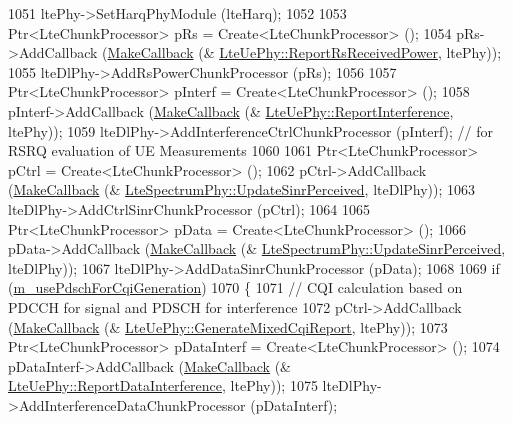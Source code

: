\begin{DoxyCode}
1051         ltePhy->SetHarqPhyModule (lteHarq);
1052 
1053         Ptr<LteChunkProcessor> pRs = Create<LteChunkProcessor> ();
1054         pRs->AddCallback (\hyperlink{group__makecallbackmemptr_ga9376283685aa99d204048d6a4b7610a4}{MakeCallback} (&
      \hyperlink{classns3_1_1LteUePhy_aca025f112e83d159f7a1b0fb822d77b6}{LteUePhy::ReportRsReceivedPower}, ltePhy));
1055         lteDlPhy->AddRsPowerChunkProcessor (pRs);
1056 
1057         Ptr<LteChunkProcessor> pInterf = Create<LteChunkProcessor> ();
1058         pInterf->AddCallback (\hyperlink{group__makecallbackmemptr_ga9376283685aa99d204048d6a4b7610a4}{MakeCallback} (&
      \hyperlink{classns3_1_1LteUePhy_aac25482ac025b043e7d0516927984720}{LteUePhy::ReportInterference}, ltePhy));
1059         lteDlPhy->AddInterferenceCtrlChunkProcessor (pInterf); \textcolor{comment}{// for RSRQ evaluation of UE Measurements}
1060 
1061         Ptr<LteChunkProcessor> pCtrl = Create<LteChunkProcessor> ();
1062         pCtrl->AddCallback (\hyperlink{group__makecallbackmemptr_ga9376283685aa99d204048d6a4b7610a4}{MakeCallback} (&
      \hyperlink{classns3_1_1LteSpectrumPhy_a81e55daa6bf70765f7e7ff7cca0faed9}{LteSpectrumPhy::UpdateSinrPerceived}, lteDlPhy));
1063         lteDlPhy->AddCtrlSinrChunkProcessor (pCtrl);
1064 
1065         Ptr<LteChunkProcessor> pData = Create<LteChunkProcessor> ();
1066         pData->AddCallback (\hyperlink{group__makecallbackmemptr_ga9376283685aa99d204048d6a4b7610a4}{MakeCallback} (&
      \hyperlink{classns3_1_1LteSpectrumPhy_a81e55daa6bf70765f7e7ff7cca0faed9}{LteSpectrumPhy::UpdateSinrPerceived}, lteDlPhy));
1067         lteDlPhy->AddDataSinrChunkProcessor (pData);
1068 
1069         \textcolor{keywordflow}{if} (\hyperlink{classns3_1_1MmWaveHelper_aa22c5cc230f1e0e6bfd280ed2b6f9635}{m\_usePdschForCqiGeneration})
1070         \{
1071                 \textcolor{comment}{// CQI calculation based on PDCCH for signal and PDSCH for interference}
1072                 pCtrl->AddCallback (\hyperlink{group__makecallbackmemptr_ga9376283685aa99d204048d6a4b7610a4}{MakeCallback} (&
      \hyperlink{classns3_1_1LteUePhy_afdd5a3c3b8a0a7bc8996254bd693e0de}{LteUePhy::GenerateMixedCqiReport}, ltePhy));
1073                 Ptr<LteChunkProcessor> pDataInterf = Create<LteChunkProcessor> ();      
1074                 pDataInterf->AddCallback (\hyperlink{group__makecallbackmemptr_ga9376283685aa99d204048d6a4b7610a4}{MakeCallback} (&
      \hyperlink{classns3_1_1LteUePhy_a20cf3a136a19472fdab4ac7bd78f2c22}{LteUePhy::ReportDataInterference}, ltePhy));
1075                 lteDlPhy->AddInterferenceDataChunkProcessor (pDataInterf);

\end{DoxyCode}
